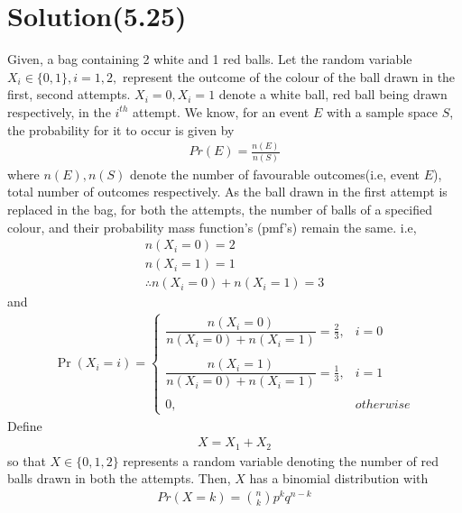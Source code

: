 \documentclass[journal,12pt,twocolumn]{IEEEtran}
\begin{document}
\section*{Solution(5.25)}
Given, a bag containing 2 white and 1 red balls. Let the random variable $X_{i}\in\{0,1\},i=1,2,$ represent the outcome of the colour of the ball drawn in the first, second attempts. $X_{i}=0,X_{i}=1$ denote a white ball, red ball being drawn respectively, in the $i^{th}$ attempt.
\newline
\newline
We know, for an event $E$ with a sample space $S$, the probability for it to occur is given by 
\begin{align}
\tag{5.25.1}
    Pr(E)=\frac{n(E)}{n(S)}
\end{align}
where $n(E),n(S)$ denote the number of favourable outcomes(i.e, event $E$), total number of outcomes respectively.
\newline
\newline
As the ball drawn in the first attempt is replaced in the bag, for both the attempts, the number of balls of a specified colour, and their probability  mass function's (pmf's) remain the same. i.e, 
\begin{align}
    \tag{5.25.2}
    n(X_{i}=0)=2\\
    \tag{5.25.3}
    n(X_{i}=1)=1\\
    \tag{5.25.4}
    \therefore n(X_{i}=0)+n(X_{i}=1)=3 
\end{align}
and
\begin{align}
    \tag{5.25.5}
    \Pr(X_{i}=i) = 
	\begin{cases}
	\dfrac{n(X_{i}=0)}{n(X_{i}=0)+n(X_{i}=1)}=\frac{2}{3}, & i=0 \\~\\[-1em]
	\dfrac{n(X_{i}=1)}{n(X_{i}=0)+n(X_{i}=1)}=\frac{1}{3}, & i=1 \\~\\[-1em]
	0, & otherwise
	\end{cases}
\end{align}
\newline
\newline
Define 
\begin{align}
    \tag{5.25.6}
    X=X_{1}+X_{2}
\end{align}
so that $X\in\{0,1,2\}$ represents a random variable denoting the number of red balls drawn in both the attempts. Then, $X$ has a binomial distribution with 
\begin{align}
    \tag{5.25.7}
    Pr(X=k)={n\choose k}p^{k}q^{n-k}
\end{align}
\end{document}
